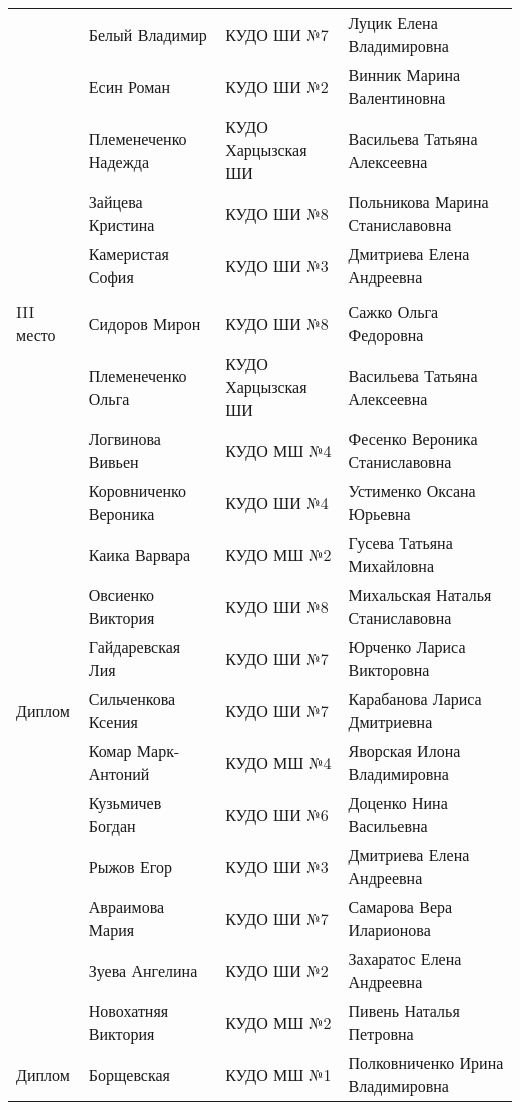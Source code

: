 \begin{longtable}{|l|l|l|l|}
          & Белый Владимир       & КУДО ШИ №7         & Луцик Елена Владимировна                  \\
          & Есин Роман           & КУДО ШИ №2         & Винник Марина Валентиновна                \\
          & Племенеченко Надежда & КУДО Харцызская ШИ & Васильева Татьяна Алексеевна              \\
          & Зайцева Кристина     & КУДО ШИ №8         & Польникова Марина Станиславовна           \\
          & Камеристая София     & КУДО ШИ №3         & Дмитриева Елена Андреевна                 \\
                                                                                                  \\
III место  & Сидоров Мирон         & КУДО ШИ №8         & Сажко Ольга Федоровна                   \\
           & Племенеченко Ольга    & КУДО Харцызская ШИ & Васильева Татьяна Алексеевна            \\
           & Логвинова Вивьен      & КУДО МШ №4         & Фесенко Вероника Станиславовна          \\
           & Коровниченко Вероника & КУДО ШИ №4         & Устименко Оксана Юрьевна                \\
           & Каика Варвара         & КУДО МШ №2         & Гусева Татьяна Михайловна               \\
           & Овсиенко Виктория     & КУДО ШИ №8         & Михальская Наталья Станиславовна        \\
           & Гайдаревская Лия      & КУДО ШИ №7         & Юрченко Лариса Викторовна               \\
Диплом     & Сильченкова Ксения    & КУДО ШИ №7         & Карабанова Лариса Дмитриевна            \\
           & Комар Марк-Антоний    & КУДО МШ №4         & Яворская Илона Владимировна             \\
           & Кузьмичев Богдан      & КУДО ШИ №6         & Доценко Нина Васильевна                 \\
           & Рыжов Егор            & КУДО ШИ №3         & Дмитриева Елена Андреевна               \\
           & Авраимова Мария       & КУДО ШИ №7         & Самарова Вера Иларионова                \\
           & Зуева Ангелина        & КУДО ШИ №2         & Захаратос Елена Андреевна               \\
           & Новохатняя Виктория   & КУДО МШ №2         & Пивень Наталья Петровна                 \\
Диплом     & Борщевская            & КУДО МШ №1         & Полковниченко Ирина Владимировна        \\

\end{longtable}
